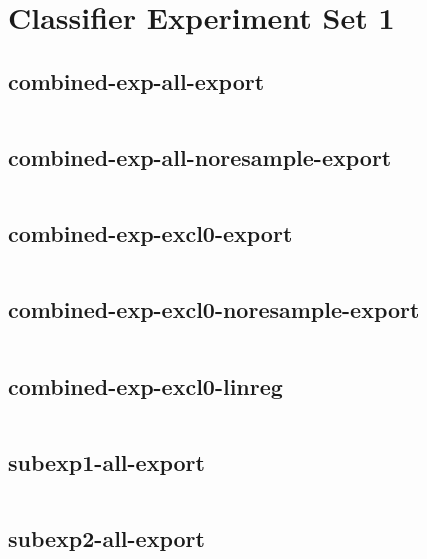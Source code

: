\section{Classifier Experiment Set 1}
\label{sec:results:cexp1}
\subsection{combined-exp-all-export}
\inputminted[fontsize=\footnotesize,breaklines=true]{text}{../data/processed/classification-expset-1/combined-exp-all-export.txt}
\clearpage

\subsection{combined-exp-all-noresample-export}
\inputminted[fontsize=\footnotesize,breaklines=true]{text}{../data/processed/classification-expset-1/combined-exp-all-noresample-export.txt}
\clearpage

\subsection{combined-exp-excl0-export}
\inputminted[fontsize=\footnotesize,breaklines=true]{text}{../data/processed/classification-expset-1/combined-exp-excl0-export.txt}
\clearpage

\subsection{combined-exp-excl0-noresample-export}
\inputminted[fontsize=\footnotesize,breaklines=true]{text}{../data/processed/classification-expset-1/combined-exp-excl0-noresample-export.txt}
\clearpage

\subsection{combined-exp-excl0-linreg}
\inputminted[fontsize=\footnotesize,breaklines=true]{text}{../data/processed/classification-expset-1/combined-exp-excl0-linreg.txt}
\clearpage

\subsection{subexp1-all-export}
\inputminted[fontsize=\footnotesize,breaklines=true]{text}{../data/processed/classification-expset-1/subexp1-all-export.txt}
\clearpage

\subsection{subexp2-all-export}
\inputminted[fontsize=\footnotesize,breaklines=true]{text}{../data/processed/classification-expset-1/subexp2-all-export.txt}
\clearpage

